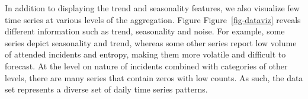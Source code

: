 \documentclass[
  authoryear,
  preprint,
  3p]{elsarticle}
\begin{document}
In addition to displaying the trend and seasonality features, we also
visualize few time series at various levels of the aggregation. Figure
Figure~\ref{fig-dataviz} reveals different information such as trend,
seasonality and noise. For example, some series depict seasonality and
trend, whereas some other series report low volume of attended incidents
and entropy, making them more volatile and difficult to forecast. At the
level on nature of incidents combined with categories of other levels,
there are many series that contain zeros with low counts. As such, the
data set represents a diverse set of daily time series patterns.

\begin{figure}

\begin{minipage}[t]{0.49\linewidth}

{\centering 


}

\end{minipage}%
%
\begin{minipage}[t]{0.02\linewidth}

{\centering 

~

}

\end{minipage}%
%
\begin{minipage}[t]{0.49\linewidth}

{\centering 


}

\end{minipage}%
\newline
\begin{minipage}[t]{0.49\linewidth}

{\centering 


}


\end{minipage}
\end{figure}
\end{document}
